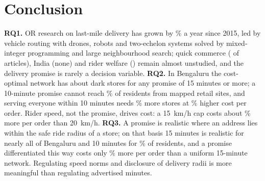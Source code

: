 \section{Conclusion}\label{sec:conclusion}

\textbf{RQ1.} OR research on last-mile delivery has grown by \BibGrowthPct\% a year since 2015, led by vehicle routing with drones, robots and two-echelon systems solved by mixed-integer programming and large neighbourhood search; quick commerce (\BibQComm{} of \BibIncluded{} articles), India (none) and rider welfare (\BibWelfare) remain almost unstudied, and the delivery promise is rarely a decision variable.
\textbf{RQ2.} In Bengaluru the cost-optimal network has about \StoresTFifteen{} dark stores for any promise of 15 minutes or more; a 10-minute promise cannot reach \UnreachTenPct\% of residents from mapped retail sites, and serving everyone within 10 minutes needs \GridStorePremiumPct\% more stores at \GridCostPremiumPct\% higher cost per order. Rider speed, not the promise, drives cost: a 15~km/h cap costs about \SpeedCapPremiumPct\% more per order than 20~km/h.
\textbf{RQ3.} A promise is realistic where an address lies within the safe ride radius of a store; on that basis 15 minutes is realistic for nearly all of Bengaluru and 10 minutes for \MixedTenShare\% of residents, and a promise differentiated this way costs only \MixedPremiumPct\% more per order than a uniform 15-minute network. Regulating speed norms and disclosure of delivery radii is more meaningful than regulating advertised minutes.
